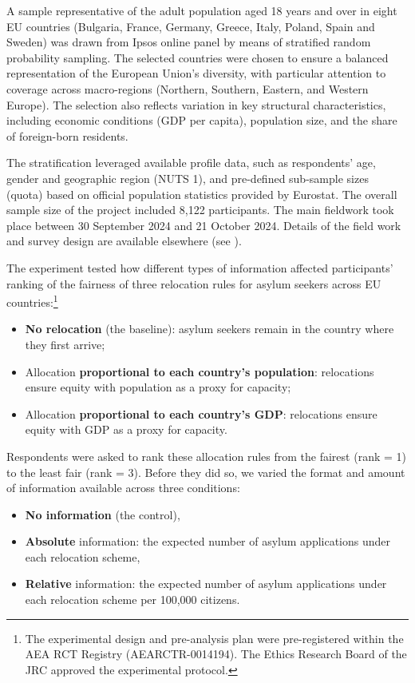 \documentclass[
  12pt,
  a4paper,
]{article}
\begin{document}
A sample representative of the adult population aged 18 years and over in eight EU countries (Bulgaria, France, Germany, Greece, Italy, Poland, Spain and Sweden) was drawn from Ipsos online panel by means of stratified random probability sampling. The selected countries were chosen to ensure a balanced representation of the European Union's diversity, with particular attention to coverage across macro-regions (Northern, Southern, Eastern, and Western Europe). The selection also reflects variation in key structural characteristics, including economic conditions (GDP per capita), population size, and the share of foreign-born residents.

The stratification leveraged available profile data, such as respondents' age, gender and geographic region (NUTS 1), and pre-defined sub-sample sizes (quota) based on official population statistics provided by Eurostat. The overall sample size of the project included 8,122 participants. The main fieldwork took place between 30 September 2024 and 21 October 2024. Details of the field work and survey design are available elsewhere (see ).

The experiment tested how different types of information affected participants' ranking of the fairness of three relocation rules for asylum seekers across EU countries:\footnote{
  The experimental design and pre-analysis plan were pre-registered within the AEA RCT Registry (AEARCTR-0014194). The Ethics Research Board of the JRC approved the experimental protocol.}

\begin{itemize}
\item
  \textbf{No relocation} (the baseline): asylum seekers remain in the country where they first arrive;
\item
  Allocation \textbf{proportional to each country's population}: relocations ensure equity with population as a proxy for capacity;
\item
  Allocation \textbf{proportional to each country's GDP}: relocations ensure equity with GDP as a proxy for capacity.
\end{itemize}

Respondents were asked to rank these allocation rules from the fairest (rank = 1) to the least fair (rank = 3). Before they did so, we varied the format and amount of information available across three conditions:

\begin{itemize}
\item
  \textbf{No information} (the control),
\item
  \textbf{Absolute} information: the expected number of asylum applications under each relocation scheme,
\item
  \textbf{Relative} information: the expected number of asylum applications under each relocation scheme per 100,000 citizens.
\end{itemize}
\end{document}
